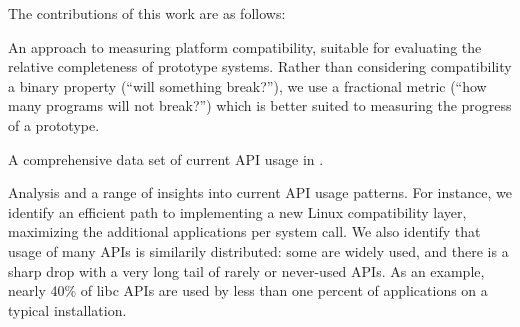 

The contributions of this work are as follows:
\begin{compactitem}
\item An approach to measuring platform compatibility, suitable for evaluating the relative completeness of prototype systems.
Rather than considering compatibility a binary property (``will something break?''),
we use a fractional metric 
(``how many programs will not break?'')
which is better suited to measuring  the progress of 
a prototype.
\item A comprehensive data set of current API usage in \osversion{}.  
\item Analysis and a range of insights into current API usage patterns. For instance, we identify an efficient path to implementing
a new Linux compatibility layer, maximizing the additional applications per system call.  We also identify
that usage of many APIs is similarily distributed: some are widely used, and there is a sharp drop with a very long tail
of rarely or never-used APIs.  As an example, nearly 40\% of libc APIs are used by less than one percent of applications
on a typical installation. %
\end{compactitem}

